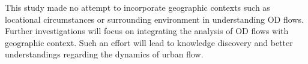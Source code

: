 \documentclass[a4paper,UKenglish]{lipics-v2018}
\begin{document}

This study made no attempt to incorporate geographic contexts such as locational circumstances or surrounding environment in understanding OD flows. 
Further investigations will focus on integrating the analysis of OD flows with geographic context.
Such an effort will lead to knowledge discovery and better understandings regarding the dynamics of urban flow.


%
%
%
%
%










\end{document}
